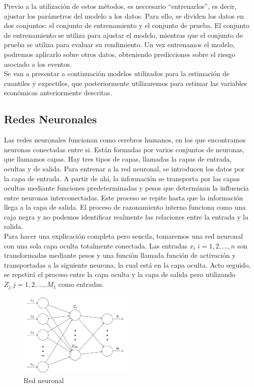\documentclass[11pt]{book}
\theoremstyle{plain} %
\theoremstyle{definition} %
\begin{document}
Previo a la utilización de estos métodos, es neccesario “entrenarlos”, es decir, ajustar los 
parámetros del modelo a los datos. Para ello, se dividen los datos en dos conjuntos: el 
conjunto de entrenamiento y el conjunto de prueba. El conjunto de entrenamiento se 
utiliza para ajustar el modelo, mientras que el conjunto de prueba se utiliza para evaluar 
su rendimiento. Un vez entrenamos el modelo, podremos aplicarlo sobre otros datos, 
obteniendo predicciones sobre el riesgo asociado a los eventos.\\

Se van a presentar a continuación modelos utilizados para la estimación de cuantiles y 
expectiles, que posteriormente utilizaremos para estimar las variables económicas 
anteriormente descritas. 

\subsection{Redes Neuronales}
Las redes neuronales funcionan como cerebros humanos, en los que encontramos 
neuronas conectadas entre si. Están formadas por varios conjuntos de neuronas, que 
llamamos capas.  Hay tres tipos de capas, llamadas la capas de entrada, ocultas y de salida. 
Para entrenar a la red neuronal, se introducen los datos por la capa de entrada. A partir de 
ahí, la información se transporta por las capas ocultas mediante funciones predeterminadas 
y pesos que determinan la influencia entre neuronas interconectadas. Este proceso se 
repite hasta que la información llega a la capa de salida. El proceso de razonamiento 
interno funciona como una caja negra y no podemos identificar realmente las relaciones 
entre la entrada y la salida. \\

Para hacer una explicación completa pero sencila, tomaremos una red neuronal con 
una sola capa oculta totalmente conectada. Las entradas $x_{i} \; i= 1, 2, \dots, n$ son 
transformadas mediante pesos y una función llamada función de activación y transportadas 
a la siguiente neurona, la cual está en la capa oculta. Acto seguido, se repetirá el proceso 
entre la capa oculta y la capa de salida pero utilizando $Z_j \; j= 1, 2, \dots, M_1$ como 
entradas.

\begin{figure}[h]
    \centering
    \includegraphics[width=0.5\textwidth]{picture1.png} 
    \caption{Red neuronal}
    \label{fig:miImagen} 
\end{figure}
\end{document}
